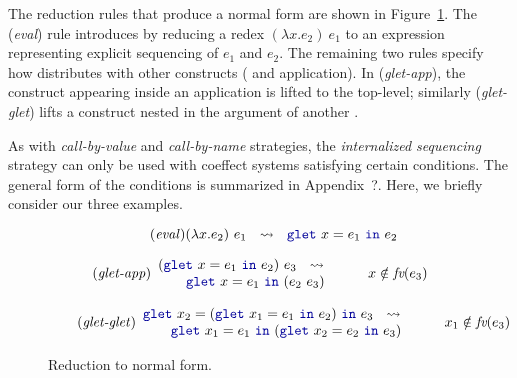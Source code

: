 The reduction rules that produce a normal form are shown in Figure~\ref{fig:flat-normal-form}. The
(\emph{eval}) rule introduces  by reducing a redex $(\lambda x.e_2)~e_1$ to an expression
representing explicit sequencing of $e_1$ and $e_2$. The remaining two rules specify how 
distributes with other constructs ( and application). In (\emph{glet-app}), the 
construct appearing inside an application is lifted to the top-level; similarly (\emph{glet-glet}) 
lifts a  construct nested in the argument of another .

As with \emph{call-by-value} and \emph{call-by-name} strategies, the \emph{internalized sequencing}
strategy can only be used with coeffect systems satisfying certain conditions. The general form of
the conditions is summarized in Appendix~?. Here, we briefly consider our three examples.


\begin{figure}[t]

\begin{equation*}
\tag{\emph{eval}}
(\lambda x.e_2)~e_1 ~~\leadsto~~ \kvd{glet}~x=e_1~\kvd{in}~e_2
\end{equation*}

\begin{equation*}
\tag{\emph{glet-app}}
\begin{array}{l}
  (\kvd{glet}~x=e_1~\kvd{in}~e_2)~e_3  ~~\leadsto~~\\ \qquad \kvd{glet}~x=e_1~\kvd{in}~(e_2~e_3)
\end{array}
\qquad x \notin \textit{fv}(e_3)\qquad
\end{equation*}

\begin{equation*}
\tag{\emph{glet-glet}}
\begin{array}{l}
  \kvd{glet}~x_2=(\kvd{glet}~x_1 = e_1~\kvd{in}~e_2)~\kvd{in}~e_3  ~~\leadsto~~\\
  \qquad \kvd{glet}~x_1=e_1~\kvd{in}~(\kvd{glet}~x_2=e_2~\kvd{in}~e_3)
\end{array}
\qquad x_1 \notin \textit{fv}(e_3)\qquad
\end{equation*}

\caption{Reduction to normal form.}
\label{fig:flat-normal-form}
\end{figure}


